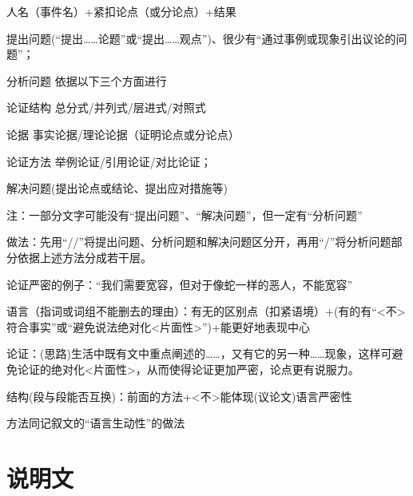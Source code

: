 {
人名（事件名）+紧扣论点（或分论点）+结果

\begin{asparaenum}[(1)]
\item 提出问题(``提出\ldots{}\ldots{}论题''或``提出\ldots{}\ldots{}观点'')、很少有``通过事例或现象引出议论的问题''；
\item 分析问题
依据以下三个方面进行
\begin{compactdesc}
\item[论证结构]总分式/并列式/层进式/对照式
\item[论据]事实论据/理论论据（证明论点或分论点）
\item[论证方法]举例论证/引用论证/对比论证；
\end{compactdesc}
\item 解决问题(提出论点或结论、提出应对措施等)
\end{asparaenum}
注：一部分文字可能没有``提出问题''、``解决问题''，但一定有``分析问题''\par
做法：先用``//''将提出问题、分析问题和解决问题区分开，再用``/''将分析问题部分依据上述方法分成若干层。

论证严密的例子：“我们需要宽容，但对于像蛇一样的恶人，不能宽容”
\begin{asparaenum}[(1)]
\item 语言（指词或词组不能删去的理由）：有无的区别点（扣紧语境）+(有的有``<不>符合事实''或``避免说法绝对化<片面性>'')+能更好地表现中心
\item 论证：(思路)生活中既有文中重点阐述的\ldots{}\ldots{}，又有它的另一种\ldots{}\ldots{}现象，这样可避免论证的绝对化\mbox{<片面性>}，从而使得论证更加严密，论点更有说服力。
\item 结构(段与段能否互换)：前面的方法+<不>能体现(议论文)语言严密性
\end{asparaenum}

  方法同记叙文的``语言生动性''的做法

\section{说明文}

}
